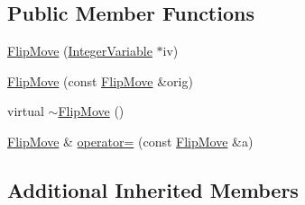 \subsection*{Public Member Functions}
\begin{DoxyCompactItemize}
\item 
\hyperlink{class_flip_move_a31ec8ef20c4c96b1729092d1da02fe3e}{Flip\-Move} (\hyperlink{class_integer_variable}{Integer\-Variable} $\ast$iv)
\item 
\hyperlink{class_flip_move_a09277644ca1bae49d508646b05a6d064}{Flip\-Move} (const \hyperlink{class_flip_move}{Flip\-Move} \&orig)
\item 
virtual \hyperlink{class_flip_move_a9860e1365a6e9ab60b8de4265fe153ec}{$\sim$\-Flip\-Move} ()
\item 
\hyperlink{class_flip_move}{Flip\-Move} \& \hyperlink{class_flip_move_adda4f1374acf2a10425e86205df2d260}{operator=} (const \hyperlink{class_flip_move}{Flip\-Move} \&a)
\end{DoxyCompactItemize}
\subsection*{Additional Inherited Members}



